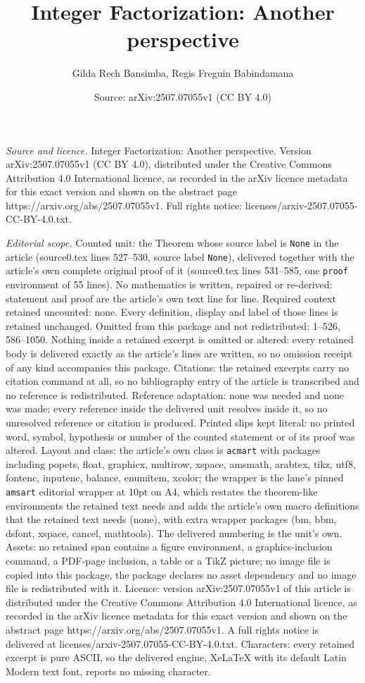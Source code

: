 \documentclass[10pt,a4paper]{amsart}
\title[Integer Factorization: Another perspective]{Integer Factorization: Another perspective}
\author{Gilda Rech Bansimba, Regis Freguin Babindamana}
\date{Source: arXiv:2507.07055v1 (CC BY 4.0)}
\begin{document}
\maketitle

\noindent\emph{Source and licence.} Integer Factorization: Another perspective. Version arXiv:2507.07055v1 (CC BY 4.0), distributed under the Creative Commons Attribution 4.0 International licence, as recorded in the arXiv licence metadata for this exact version and shown on the abstract page https://arxiv.org/abs/2507.07055v1. Full rights notice: licenses/arxiv-2507.07055-CC-BY-4.0.txt.\par\smallskip

\noindent\textit{Editorial scope.} Counted unit: the Theorem whose source label is \texttt{None} in the article (source0.tex lines 527--530, source label \texttt{None}), delivered together with the article's own complete original proof of it (source0.tex lines 531--585, one \texttt{proof} environment of 55 lines). No mathematics is written, repaired or re-derived: statement and proof are the article's own text line for line. Required context retained uncounted: none. Every definition, display and label of those lines is retained unchanged. Omitted from this package and not redistributed: 1--526, 586--1050. Nothing inside a retained excerpt is omitted or altered: every retained body is delivered exactly as the article's lines are written, so no omission receipt of any kind accompanies this package. Citations: the retained excerpts carry no citation command at all, so no bibliography entry of the article is transcribed and no reference is redistributed. Reference adaptation: none was needed and none was made; every reference inside the delivered unit resolves inside it, so no unresolved reference or citation is produced. Printed slips kept literal: no printed word, symbol, hypothesis or number of the counted statement or of its proof was altered. Layout and class: the article's own class is \texttt{acmart} with packages including popets, float, graphicx, multirow, xspace, amsmath, arabtex, tikz, utf8, fontenc, inputenc, balance, enumitem, xcolor; the wrapper is the lane's pinned \texttt{amsart} editorial wrapper at 10pt on A4, which restates the theorem-like environments the retained text needs and adds the article's own macro definitions that the retained text needs (none), with extra wrapper packages (bm, bbm, dsfont, xspace, cancel, mathtools). The delivered numbering is the unit's own. Assets: no retained span contains a figure environment, a graphics-inclusion command, a PDF-page inclusion, a table or a TikZ picture; no image file is copied into this package, the package declares no asset dependency and no image file is redistributed with it. Licence: version arXiv:2507.07055v1 of this article is distributed under the Creative Commons Attribution 4.0 International licence, as recorded in the arXiv licence metadata for this exact version and shown on the abstract page https://arxiv.org/abs/2507.07055v1. A full rights notice is delivered at licenses/arxiv-2507.07055-CC-BY-4.0.txt. Characters: every retained excerpt is pure ASCII, so the delivered engine, XeLaTeX with its default Latin Modern text font, reports no missing character.
\end{document}
